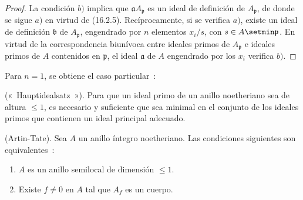 \begin{proof}
La condición $b)$ implica que $\mathfrak{a}A_{\mathfrak{p}}$ es un ideal de
definición de $A_{\mathfrak{p}}$, de donde se sigue $a)$ en virtud de (16.2.5).
Recíprocamente, si se verifica $a)$, existe un ideal de definición
$\mathfrak{b}$ de $A_{\mathfrak{p}}$, engendrado por $n$ elementos $x_i/s$, con
$s\in A\setmin\mathfrak{p}$. En virtud de la correspondencia biunívoca entre ideales
primos de $A_{\mathfrak{p}}$ e ideales primos de $A$ contenidos en
$\mathfrak{p}$, el ideal $\mathfrak{a}$ de $A$ engendrado por los $x_i$ verifica
$b)$.
\end{proof}


Para $n=1$, se obtiene el caso particular~:

\begin{corollary}[16.3.2]
\label{0.16.3.2-fr}
\textup{(«~Hauptidealsatz~»).}
Para que un ideal primo de un anillo noetheriano sea de altura $\leq1$, es
necesario y suficiente que sea minimal en el conjunto de los ideales primos que
contienen un ideal principal adecuado.
\end{corollary}

\begin{corollary}[16.3.3]
\label{0.16.3.3-fr}
\textup{(Artin-Tate).}
Sea $A$ un anillo íntegro noetheriano. Las condiciones siguientes son
equivalentes~:
\begin{enumerate}
  \item[\textup{a)}] $A$ es un anillo semilocal de dimensión $\leq1$.
  \item[\textup{b)}] Existe $f\neq0$ en $A$ tal que $A_f$ es un cuerpo.
\end{enumerate}
\end{corollary}


